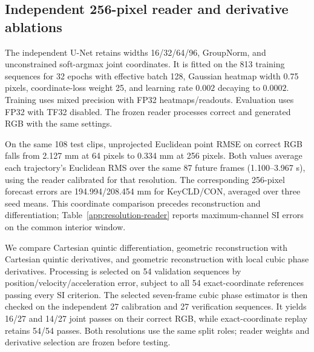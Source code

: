 \subsection{Independent 256-pixel reader and derivative ablations}
The independent U-Net retains widths 16/32/64/96, GroupNorm, and unconstrained soft-argmax joint coordinates. It is fitted on the 813 training sequences for 32 epochs with effective batch 128, Gaussian heatmap width 0.75 pixels, coordinate-loss weight 25, and learning rate $0.002$ decaying to $0.0002$. Training uses mixed precision with FP32 heatmaps/readouts. Evaluation uses FP32 with TF32 disabled. The frozen reader processes correct and generated RGB with the same settings.

On the same 108 test clips, unprojected Euclidean point RMSE on correct RGB falls from 2.127 mm at 64 pixels to 0.334 mm at 256 pixels. Both values average each trajectory's Euclidean RMS over the same 87 future frames (1.100--3.967 s), using the reader calibrated for that resolution. The corresponding 256-pixel forecast errors are 194.994/208.454 mm for KeyCLD/CON, averaged over three seed means. This coordinate comparison precedes reconstruction and differentiation; Table~\ref{app:resolution-reader} reports maximum-channel SI errors on the common interior window.

We compare Cartesian quintic differentiation, geometric reconstruction with Cartesian quintic derivatives, and geometric reconstruction with local cubic phase derivatives. Processing is selected on 54 validation sequences by position/velocity/acceleration error, subject to all 54 exact-coordinate references passing every SI criterion. The selected seven-frame cubic phase estimator is then checked on the independent 27 calibration and 27 verification sequences. It yields 16/27 and 14/27 joint passes on their correct RGB, while exact-coordinate replay retains 54/54 passes. Both resolutions use the same split roles; reader weights and derivative selection are frozen before testing.

